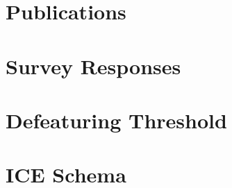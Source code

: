 \documentclass[openany,oneside,12pt,a4paper]{UoP_template}
\begin{document}
\thispagestyle{empty} %
\chapter*{Publications}


\pagebreak \thispagestyle{empty} %

\begin{appendices}
\chapter{Survey Responses} \label{appendix:survey}

\chapter{Defeaturing Threshold} \label{appendix:threshold}

\chapter{ICE Schema} \label{appendix:ice}

\end{appendices}
\end{document}
